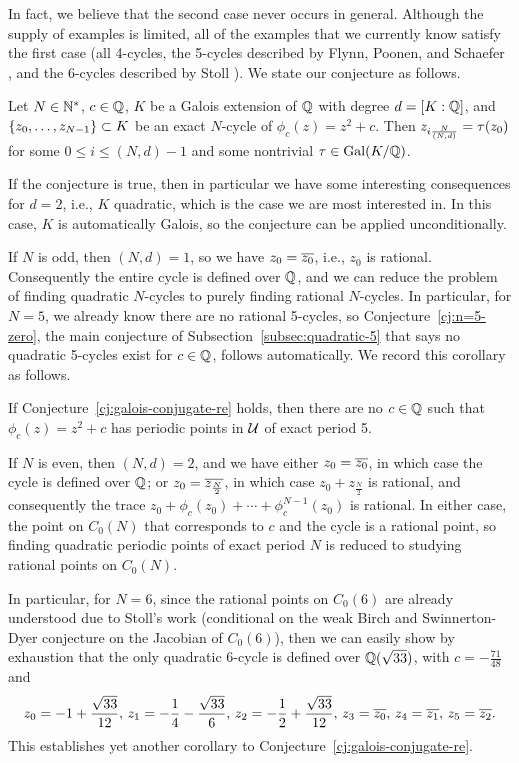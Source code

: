 In fact, we believe that the second case never occurs in
general. Although the supply of examples is limited, all of the
examples that we currently know satisfy the first case (all 4-cycles,
the 5-cycles described by Flynn, Poonen, and Schaefer
\cite{MR1480542}, and the 6-cycles described by Stoll
\cite{MR2465796}). We state our conjecture as follows.

\begin{conjecture}
  \label{cj:galois-conjugate-re}
  Let $N \in \mathbb{N}^*$, $c \in \mathbb{Q}$, $K$ be a Galois extension of $\mathbb{Q}$ with
  degree $d = [K : \mathbb{Q}]$, and $\left\{z_0, \dots, z_{N-1}\right\} \subset K$ be
  an exact $N$-cycle of $\phi_c(z) = z^2 + c$. Then $z_{i\frac{N}{(N, d)}} =
  \tau(z_0)$ for some $0 \le i \le (N, d)-1$ and some nontrivial $\tau \in
  \mathrm{Gal}(K/\mathbb{Q})$.
\end{conjecture}

If the conjecture is true, then in particular we have some interesting
consequences for $d = 2$, i.e., $K$ quadratic, which is the case we
are most interested in. In this case, $K$ is automatically Galois, so
the conjecture can be applied unconditionally.

If $N$ is odd, then $(N, d) = 1$, so we have $z_0 = \overline{z_0}$, i.e.,
$z_0$ is rational. Consequently the entire cycle is defined over $\mathbb{Q}$,
and we can reduce the problem of finding quadratic $N$-cycles to
purely finding rational $N$-cycles. In particular, for $N = 5$, we
already know there are no rational 5-cycles, so
Conjecture~\ref{cj:n=5-zero}, the main conjecture of
Subsection~\ref{subsec:quadratic-5} that says no quadratic 5-cycles
exist for $c \in \mathbb{Q}$, follows automatically. We record this corollary
as follows.

\begin{corollary}
  If Conjecture~\ref{cj:galois-conjugate-re} holds, then there are no $c
  \in \mathbb{Q}$ such that $\phi_c(z) = z^2 + c$ has periodic points in $\mathcal{U}$
  of exact period 5.
\end{corollary}

If $N$ is even, then $(N, d) = 2$, and we have either $z_0 =
\overline{z_0}$, in which case the cycle is defined over $\mathbb{Q}$; or $z_0 =
\overline{z_{\frac{N}{2}}}$, in which case $z_0 + z_{\frac{N}{2}}$ is
rational, and consequently the trace $z_0 + \phi_c(z_0) + \cdots +
\phi_c^{N-1}(z_0)$ is rational. In either case, the point on $C_0(N)$
that corresponds to $c$ and the cycle is a rational point, so finding
quadratic periodic points of exact period $N$ is reduced to studying
rational points on $C_0(N)$.

In particular, for $N = 6$, since the rational points on $C_0(6)$ are
already understood due to Stoll's work \cite{MR2465796} (conditional
on the weak Birch and Swinnerton-Dyer conjecture on the Jacobian of
$C_0(6)$), then we can easily show by exhaustion that the only
quadratic 6-cycle is defined over $\mathbb{Q}(\sqrt{33})$, with $c =
-\frac{71}{48}$ and
\begin{equation}
  \label{eq:6-cycle}
  z_0 = -1 + \frac{\sqrt{33}}{12},\,
  z_1 = -\frac{1}{4} - \frac{\sqrt{33}}{6},\,
  z_2 = -\frac{1}{2} + \frac{\sqrt{33}}{12},\,
  z_3 = \overline{z_0},\,
  z_4 = \overline{z_1},\,
  z_5 = \overline{z_2}.
\end{equation}
This establishes yet another corollary to
Conjecture~\ref{cj:galois-conjugate-re}.

